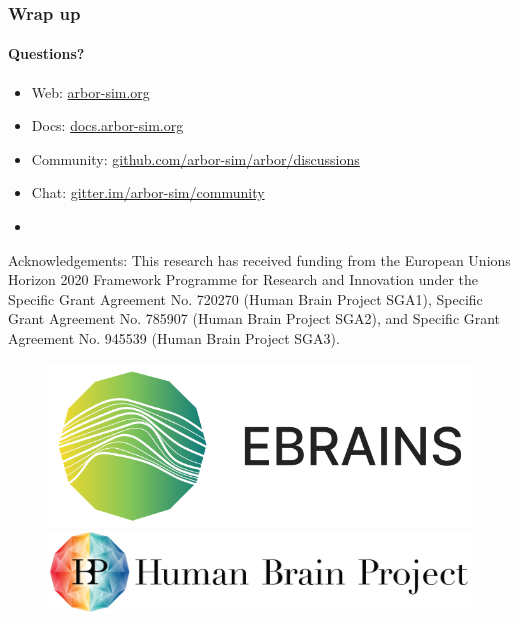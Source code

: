 \documentclass[t,aspectratio=1610]{beamer}
\begin{document}
\begin{frame}
    \frametitle{Wrap up}
    \framesubtitle{Questions?}
    \begin{itemize}
        \item Web: \url{arbor-sim.org}
        \item Docs: \url{docs.arbor-sim.org}
        \item Community: \url{github.com/arbor-sim/arbor/discussions}
        \item Chat: \url{gitter.im/arbor-sim/community}
        \item[]
    \end{itemize}

    { \scriptsize Acknowledgements: This research has received funding from the European Unions
    Horizon 2020 Framework Programme for Research and
    Innovation under the Specific Grant Agreement No. 720270
    (Human Brain Project SGA1), Specific Grant Agreement No.
    785907 (Human Brain Project SGA2), and Specific Grant
    Agreement No. 945539 (Human Brain Project SGA3). }
    \newline
    \begin{figure}[h]
        \begin{center}
            \includegraphics[width=0.2\linewidth]{ebrains_logo.png}
            \hspace{2em}
            \includegraphics[width=0.4\linewidth]{HBP_logo.jpg}
        \end{center}
    \end{figure}
\end{frame}
\end{document}
